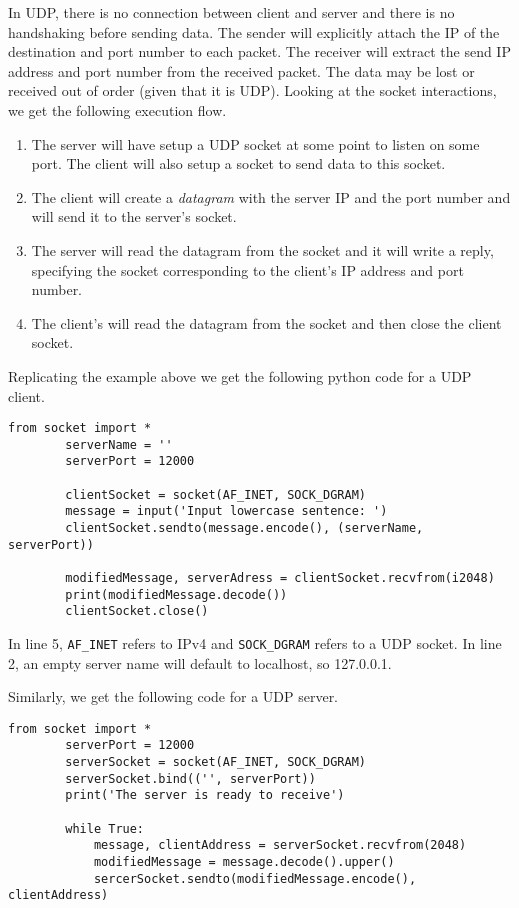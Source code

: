 \begin{example}
    In UDP, there is no connection between client and server and there is no handshaking before sending data. 
    The sender will explicitly attach the IP of the destination and port number to each packet. 
    The receiver will extract the send IP address and port number from the received packet.
    The data may be lost or received out of order (given that it is UDP).
    Looking at the socket interactions, we get the following execution flow.
    \begin{enumerate}
        \item The server will have setup a UDP socket at some point to listen on some port. The client will also setup a socket to send data to this socket.
        \item The client will create a \emph{datagram} with the server IP and the port number and will send it to the server's socket.
        \item The server will read the datagram from the socket and it will write a reply, specifying the socket corresponding to the client's IP address and port number.
        \item The client's will read the datagram from the socket and then close the client socket.
    \end{enumerate}
    Replicating the example above we get the following python code for a UDP client.
    \begin{lstlisting}[gobble = 8]
        from socket import *
        serverName = ''
        serverPort = 12000

        clientSocket = socket(AF_INET, SOCK_DGRAM)
        message = input('Input lowercase sentence: ')
        clientSocket.sendto(message.encode(), (serverName, serverPort))

        modifiedMessage, serverAdress = clientSocket.recvfrom(i2048)
        print(modifiedMessage.decode())
        clientSocket.close()
    \end{lstlisting}
    In line 5, \texttt{AF\_INET} refers to IPv4 and \texttt{SOCK\_DGRAM} refers to a UDP socket. 
    In line 2, an empty server name will default to localhost, so 127.0.0.1.

    Similarly, we get the following code for a UDP server.
    \begin{lstlisting}[gobble = 8]
        from socket import *
        serverPort = 12000
        serverSocket = socket(AF_INET, SOCK_DGRAM)
        serverSocket.bind(('', serverPort))
        print('The server is ready to receive')

        while True:
            message, clientAddress = serverSocket.recvfrom(2048)
            modifiedMessage = message.decode().upper()
            sercerSocket.sendto(modifiedMessage.encode(), clientAddress)
    \end{lstlisting}
\end{example}

